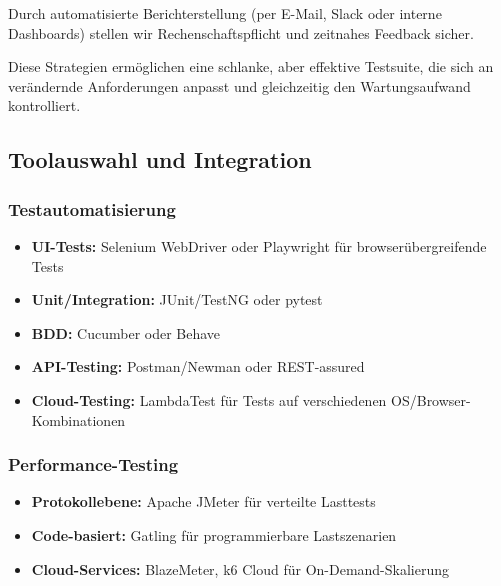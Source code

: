 Durch automatisierte Berichterstellung (per E-Mail, Slack oder interne Dashboards) stellen wir
Rechenschaftspflicht und zeitnahes Feedback sicher.

Diese Strategien ermöglichen eine schlanke, aber effektive Testsuite, die sich an verändernde
Anforderungen anpasst und gleichzeitig den Wartungsaufwand kontrolliert.

\subsection{Toolauswahl und Integration}
\subsubsection{Testautomatisierung}

\begin{itemize}
    \item \textbf{UI-Tests:}  Selenium WebDriver oder Playwright für browserübergreifende Tests
    \item \textbf{Unit/Integration:} JUnit/TestNG oder pytest
    \item \textbf{BDD:} Cucumber oder Behave
    \item \textbf{API-Testing:} Postman/Newman oder REST-assured
    \item \textbf{Cloud-Testing:} LambdaTest für Tests auf verschiedenen OS/Browser-Kombinationen
\end{itemize}

\subsubsection{Performance-Testing}
\begin{itemize}
    \item \textbf{Protokollebene:} Apache JMeter für verteilte Lasttests
    \item \textbf{Code-basiert:} Gatling für programmierbare Lastszenarien
    \item \textbf{Cloud-Services:} BlazeMeter, k6 Cloud für On-Demand-Skalierung
\end{itemize}

